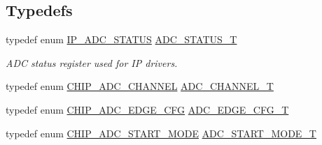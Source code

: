 \subsection*{Typedefs}
\begin{DoxyCompactItemize}
\item 
typedef enum \hyperlink{group__ADC__17XX__40XX_ga4cdc8cd4b1ae4721ff5de44c783f310a}{I\-P\-\_\-\-A\-D\-C\-\_\-\-S\-T\-A\-T\-U\-S} \hyperlink{group__ADC__17XX__40XX_ga5e2ef3f894759bbb12a9abf68518cbb7}{A\-D\-C\-\_\-\-S\-T\-A\-T\-U\-S\-\_\-\-T}
\begin{DoxyCompactList}\small\item\em A\-D\-C status register used for I\-P drivers. \end{DoxyCompactList}\item 
typedef enum \hyperlink{group__ADC__17XX__40XX_ga67b0a9ec8f34cf712b1f1c0119ba3d50}{C\-H\-I\-P\-\_\-\-A\-D\-C\-\_\-\-C\-H\-A\-N\-N\-E\-L} \hyperlink{group__ADC__17XX__40XX_ga30ee7058bc7cc1daff718b29b42bed4e}{A\-D\-C\-\_\-\-C\-H\-A\-N\-N\-E\-L\-\_\-\-T}
\item 
typedef enum \hyperlink{group__ADC__17XX__40XX_gaba28e4e0734cc41087bae0c96d5090a8}{C\-H\-I\-P\-\_\-\-A\-D\-C\-\_\-\-E\-D\-G\-E\-\_\-\-C\-F\-G} \hyperlink{group__ADC__17XX__40XX_ga18d12879b004e16af3b47467a2d81d56}{A\-D\-C\-\_\-\-E\-D\-G\-E\-\_\-\-C\-F\-G\-\_\-\-T}
\item 
typedef enum \hyperlink{group__ADC__17XX__40XX_ga125e3c848732e5fa6e064354f618f57c}{C\-H\-I\-P\-\_\-\-A\-D\-C\-\_\-\-S\-T\-A\-R\-T\-\_\-\-M\-O\-D\-E} \hyperlink{group__ADC__17XX__40XX_ga68aae5a89b4dabc910e457a00e57ea8c}{A\-D\-C\-\_\-\-S\-T\-A\-R\-T\-\_\-\-M\-O\-D\-E\-\_\-\-T}
\end{DoxyCompactItemize}
